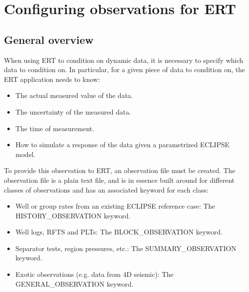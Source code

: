 \documentclass[a4paper,10pt,english]{sphinxmanual}
\begin{document}
\chapter{Configuring observations for ERT}
\label{\detokenize{observations/index:configuring-observations-for-ert}}\label{\detokenize{observations/index::doc}}

\section{General overview}
\label{\detokenize{observations/index:general-overview}}
When using ERT to condition on dynamic data, it is necessary to
specify which data to condition on. In particular, for a given piece
of data to condition on, the ERT  application needs to know:
\begin{itemize}
\item {} 
The actual measured value of the data.

\item {} 
The uncertainty of the measured data.

\item {} 
The time of measurement.

\item {} 
How to simulate a response of the data given a parametrized ECLIPSE model.

\end{itemize}

To provide this observation to ERT, an observation file must be
created. The observation file is a plain text file, and is in essence
built around for different classes of observations and has an
associated keyword for each class:
\begin{itemize}
\item {} 
Well or group rates from an existing ECLIPSE reference case: The
HISTORY\_OBSERVATION keyword.

\item {} 
Well logs, RFTS and PLTs: The BLOCK\_OBSERVATION keyword.

\item {} 
Separator tests, region pressures, etc.: The SUMMARY\_OBSERVATION
keyword.

\item {} 
Exotic observations (e.g. data from 4D seismic): The
GENERAL\_OBSERVATION keyword.

\end{itemize}
\end{document}
